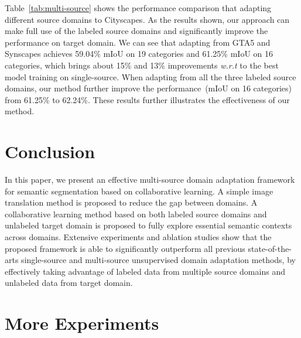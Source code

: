\documentclass[final]{cvpr}
\begin{document}
Table~\ref{tab:multi-source} shows the performance comparison that adapting different source domains to Cityscapes. As the results shown, our approach can make full use of the labeled source domains and significantly improve the performance on target domain. We can see that adapting from GTA5 and Synscapes achieves 59.04\% mIoU on 19 categories and 61.25\% mIoU on 16 categories, which brings about 15\% and 13\% improvements \textit{w.r.t} to the best model training on single-source. When adapting from all the three labeled source domains, our method further improve the performance~(mIoU on 16 categories) from 61.25\% to 62.24\%. These results further illustrates the effectiveness of our method.






\section{Conclusion}
In this paper, we present an effective multi-source domain adaptation framework for semantic segmentation based on collaborative learning. A simple image translation method is proposed to reduce the gap between domains. A collaborative learning method based on both labeled source domains and unlabeled target domain is proposed to fully explore essential semantic contexts across domains. Extensive experiments and ablation studies show that the proposed framework is able to significantly outperform all previous state-of-the-arts single-source and multi-source
unsupervised domain adaptation methods, by effectively taking advantage of labeled data from multiple source domains and unlabeled data from target domain.          





{\small
	
	
}

\appendix

\section{More Experiments}
\end{document}
